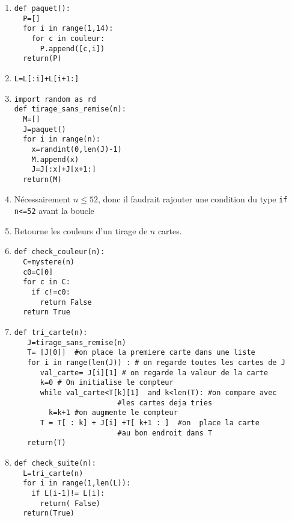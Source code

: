 \documentclass[a4paper, 11pt,reqno]{article}
\begin{document}
\begin{correction}
\begin{enumerate}
\item 
\begin{lstlisting}
def paquet():
  P=[]
  for i in range(1,14):
    for c in couleur:
      P.append([c,i])
  return(P)
\end{lstlisting}
\item  
\begin{lstlisting}
L=L[:i]+L[i+1:]
\end{lstlisting}
\item 
\begin{lstlisting}
import random as rd
def tirage_sans_remise(n):
  M=[]
  J=paquet()
  for i in range(n):
    x=randint(0,len(J)-1)
    M.append(x)
    J=J[:x]+J[x+1:]
  return(M)  
\end{lstlisting}
\item 
Nécessairement $n\leq52$, donc il faudrait rajouter une condition du type 
\texttt{if n<=52} avant la boucle 

\item Retourne les couleurs d'un tirage de $n$ cartes. 
\item 
\begin{lstlisting}
def check_couleur(n):
  C=mystere(n)
  c0=C[0]
  for c in C:
    if c!=c0:
      return False
  return True
\end{lstlisting}

\item 


\begin{lstlisting}
def tri_carte(n):
   J=tirage_sans_remise(n)
   T= [J[0]]  #on place la premiere carte dans une liste 
   for i in range(len(J)) : # on regarde toutes les cartes de J
      val_carte= J[i][1] # on regarde la valeur de la carte 
      k=0 # On initialise le compteur 
      while val_carte<T[k][1]  and k<len(T): #on compare avec 
      					#les cartes deja tries 
        k=k+1 #on augmente le compteur
      T = T[ : k] + J[i] +T[ k+1 : ]  #on  place la carte 
      					#au bon endroit dans T
   return(T) 
\end{lstlisting}

\item 
\begin{lstlisting}
def check_suite(n):
  L=tri_carte(n)
  for i in range(1,len(L)):
    if L[i-1]!= L[i]:
      return( False)
  return(True)
\end{lstlisting}

\end{enumerate}
\end{correction}
\end{document}
